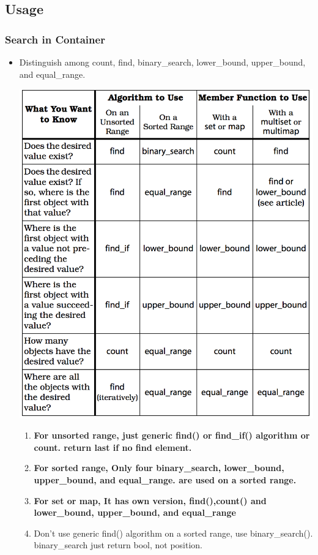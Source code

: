 \documentclass[a4paper,11pt,twoside]{book}
\begin{document}
\subsection{Usage}
\subsubsection{Search in Container}
\begin{itemize}
\item Distinguish among count, find, binary\_search, lower\_bound, upper\_bound, and equal\_range.

\includegraphics[scale=0.8]{pics/distinguish.png}

\begin{enumerate}
\item \textbf{For unsorted range, just generic find() or find\_if() algorithm or  count. return last if no find element.}
\item \textbf{For sorted range, Only four binary\_search, lower\_bound, upper\_bound, and equal\_range. are used on a sorted range.}
\item \textbf{For set or map, It has own version, find(),count() and lower\_bound, upper\_bound, and equal\_range}
\item Don't use generic find() algorithm on a sorted range,  use binary\_search(). binary\_search just return bool, not position.


\end{enumerate}
\end{itemize}
\end{document}
